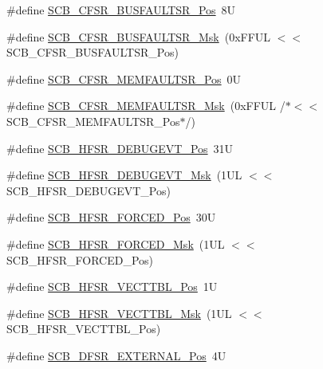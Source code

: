 \begin{DoxyCompactItemize}
\#define \hyperlink{group___c_m_s_i_s___s_c_b_ga555a24f4f57d199f91d1d1ab7c8c3c8a}{S\+C\+B\+\_\+\+C\+F\+S\+R\+\_\+\+B\+U\+S\+F\+A\+U\+L\+T\+S\+R\+\_\+\+Pos}~8U
\item 
\#define \hyperlink{group___c_m_s_i_s___s_c_b_ga26dc1ddfdc37a6b92597a6f7e498c1d6}{S\+C\+B\+\_\+\+C\+F\+S\+R\+\_\+\+B\+U\+S\+F\+A\+U\+L\+T\+S\+R\+\_\+\+Msk}~(0x\+F\+F\+U\+L $<$$<$ S\+C\+B\+\_\+\+C\+F\+S\+R\+\_\+\+B\+U\+S\+F\+A\+U\+L\+T\+S\+R\+\_\+\+Pos)
\item 
\#define \hyperlink{group___c_m_s_i_s___s_c_b_ga91f41491cec5b5acca3fbc94efbd799e}{S\+C\+B\+\_\+\+C\+F\+S\+R\+\_\+\+M\+E\+M\+F\+A\+U\+L\+T\+S\+R\+\_\+\+Pos}~0U
\item 
\#define \hyperlink{group___c_m_s_i_s___s_c_b_gad46716159a3808c9e7da22067d6bec98}{S\+C\+B\+\_\+\+C\+F\+S\+R\+\_\+\+M\+E\+M\+F\+A\+U\+L\+T\+S\+R\+\_\+\+Msk}~(0x\+F\+F\+U\+L /$\ast$$<$$<$ S\+C\+B\+\_\+\+C\+F\+S\+R\+\_\+\+M\+E\+M\+F\+A\+U\+L\+T\+S\+R\+\_\+\+Pos$\ast$/)
\item 
\#define \hyperlink{group___c_m_s_i_s___s_c_b_ga300c90cfb7b35c82b4d44ad16c757ffb}{S\+C\+B\+\_\+\+H\+F\+S\+R\+\_\+\+D\+E\+B\+U\+G\+E\+V\+T\+\_\+\+Pos}~31U
\item 
\#define \hyperlink{group___c_m_s_i_s___s_c_b_gababd60e94756bb33929d5e6f25d8dba3}{S\+C\+B\+\_\+\+H\+F\+S\+R\+\_\+\+D\+E\+B\+U\+G\+E\+V\+T\+\_\+\+Msk}~(1\+U\+L $<$$<$ S\+C\+B\+\_\+\+H\+F\+S\+R\+\_\+\+D\+E\+B\+U\+G\+E\+V\+T\+\_\+\+Pos)
\item 
\#define \hyperlink{group___c_m_s_i_s___s_c_b_gab361e54183a378474cb419ae2a55d6f4}{S\+C\+B\+\_\+\+H\+F\+S\+R\+\_\+\+F\+O\+R\+C\+E\+D\+\_\+\+Pos}~30U
\item 
\#define \hyperlink{group___c_m_s_i_s___s_c_b_ga6560d97ed043bc01152a7247bafa3157}{S\+C\+B\+\_\+\+H\+F\+S\+R\+\_\+\+F\+O\+R\+C\+E\+D\+\_\+\+Msk}~(1\+U\+L $<$$<$ S\+C\+B\+\_\+\+H\+F\+S\+R\+\_\+\+F\+O\+R\+C\+E\+D\+\_\+\+Pos)
\item 
\#define \hyperlink{group___c_m_s_i_s___s_c_b_ga77993da8de35adea7bda6a4475f036ab}{S\+C\+B\+\_\+\+H\+F\+S\+R\+\_\+\+V\+E\+C\+T\+T\+B\+L\+\_\+\+Pos}~1U
\item 
\#define \hyperlink{group___c_m_s_i_s___s_c_b_gaac5e289211d0a63fe879a9691cb9e1a9}{S\+C\+B\+\_\+\+H\+F\+S\+R\+\_\+\+V\+E\+C\+T\+T\+B\+L\+\_\+\+Msk}~(1\+U\+L $<$$<$ S\+C\+B\+\_\+\+H\+F\+S\+R\+\_\+\+V\+E\+C\+T\+T\+B\+L\+\_\+\+Pos)
\item 
\#define \hyperlink{group___c_m_s_i_s___s_c_b_ga13f502fb5ac673df9c287488c40b0c1d}{S\+C\+B\+\_\+\+D\+F\+S\+R\+\_\+\+E\+X\+T\+E\+R\+N\+A\+L\+\_\+\+Pos}~4U
\item 

\end{DoxyCompactItemize}

